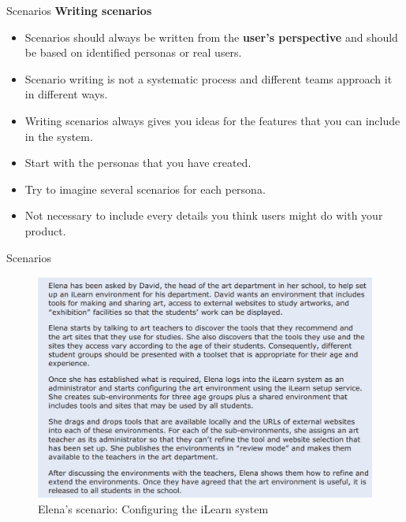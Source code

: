 \documentclass{beamer}
\begin{document}
\begin{frame}{Scenarios}
		\textbf{Writing scenarios}
		\begin{itemize}
			\item Scenarios should always be written from the \textbf{user’s perspective} and should 
			be based on identified personas or real users.
			\item Scenario writing is not a systematic process and different teams approach 
			it in different ways.
			\item Writing scenarios always gives you ideas for the features that you can 
			include in the system.
			\item Start with the personas that you have created.
			\item Try to imagine several scenarios for each persona.
			\item Not necessary to include every details you think users might do with your 
			product.
			
		\end{itemize}
	
	
\end{frame}
\begin{frame}{Scenarios}
	\begin{figure}
		\includegraphics[scale=.45]{img/m2_26.jpg}
		\caption{Elena’s scenario: Configuring the iLearn system}
	\end{figure}
	
\end{frame}
\end{document}
